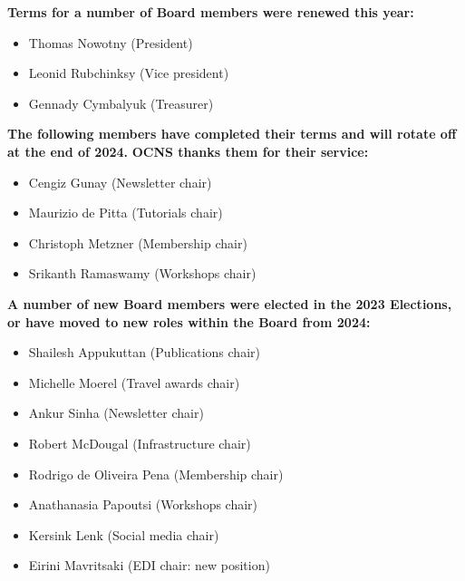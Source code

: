 \documentclass[11pt,a4paper,oneside]{article}
\begin{document}
\textbf{Terms for a number of Board members were renewed this year:}
\begin{multicols}{2}
  \begin{itemize}
    \item Thomas Nowotny (President)
    \item Leonid Rubchinksy (Vice president)
    \item Gennady Cymbalyuk (Treasurer)
  \end{itemize}
\end{multicols}

\textbf{The following members have completed their terms and will rotate off at the end of 2024.}
\textbf{OCNS thanks them for their service:}
\begin{multicols}{2}
  \begin{itemize}
    \item Cengiz Gunay (Newsletter chair)
    \item Maurizio de Pitta (Tutorials chair)
    \item Christoph Metzner (Membership chair)
    \item Srikanth Ramaswamy (Workshops chair)
  \end{itemize}
\end{multicols}

\textbf{A number of new Board members were elected in the 2023 Elections, or have moved to new roles within the Board from 2024:}
\begin{multicols}{2}
  \begin{itemize}
    \item Shailesh Appukuttan (Publications chair)
    \item Michelle Moerel (Travel awards chair)
    \item Ankur Sinha (Newsletter chair)
    \item Robert McDougal (Infrastructure chair)
    \item Rodrigo de Oliveira Pena (Membership chair)
    \item Anathanasia Papoutsi (Workshops chair)
    \item Kersink Lenk (Social media chair)
    \item Eirini Mavritsaki (EDI chair: new position)
  \end{itemize}
\end{multicols}
\end{document}
